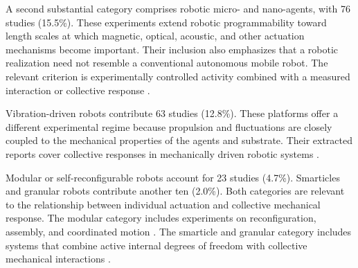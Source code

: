 A second substantial category comprises robotic micro- and nano-agents, with 76 studies (15.5\%). These experiments extend robotic programmability toward length scales at which magnetic, optical, acoustic, and other actuation mechanisms become important. Their inclusion also emphasizes that a robotic realization need not resemble a conventional autonomous mobile robot. The relevant criterion is experimentally controlled activity combined with a measured interaction or collective response \cite{Sun2021swarmingmicrodrople,Calabr2026interactiondrivena,Xie2020bioinspiredsoftmic,Pauer2021programmabledesign,MayorgaMartinez2023multimodaldrivenma,Yigit2019programmablecollect,Das2023optoelectronictraje,Rivas2023spatialpatterningo,McGovern2024multifunctionalchir,Feng2023weakionexchangeba,Sun2024multiplemagnetoopt,Cheng2025selfassemblyandco}.

Vibration-driven robots contribute 63 studies (12.8\%). These platforms offer a different experimental regime because propulsion and fluctuations are closely coupled to the mechanical properties of the agents and substrate. Their extracted reports cover collective responses in mechanically driven robotic systems \cite{Welch2018aggregatesuppressio,Welch2019activereorientation,Deblais2019howtoforceanarmy,Xi2024beamsbotsandbey,Balda2022playingwithactive,Xi2024emergentintelligenc,Mohanty2025multimodalmotionan,GuzmnLastra2026emergenceofbeating,Edwards2026robusttopologically,Musacchio2026activeembracemente,Hoek2026pistonlikeinformat,Smith2026fromswarmtoindivi}.

Modular or self-reconfigurable robots account for 23 studies (4.7\%). Smarticles and granular robots contribute another ten (2.0\%). Both categories are relevant to the relationship between individual actuation and collective mechanical response. The modular category includes experiments on reconfiguration, assembly, and coordinated motion \cite{Yang2024selfamputatingand,Hu2026diatominspired1di,Ma2024smarticle20desig,Yi2025reconfigurablerobot,Rogowski2026coordinatedselfass,Zhao2024snailinspiredrobot,Zhang2026anisotropicshapesh,Li2019particleroboticsba,Bhattacharjee2026collectiveassembly,Oliveri2021continuouslearning,Drew2021acousticcommunicati}. The smarticle and granular category includes systems that combine active internal degrees of freedom with collective mechanical interactions \cite{Li2018supersmarticlealo,Bhamla2021collectivetransport,Vardhan2022glidersinshapecha,Savoie2018phototacticsupersma,OzkanAydin2020collectiveprotectio,Luo2025flockingphasesepar,Warkentin2018locomotingrobotsco,Chvykov2020lowrattlingapred,Savoie2019arobotmadeofrobo,Li2020programmingactiveg}.

